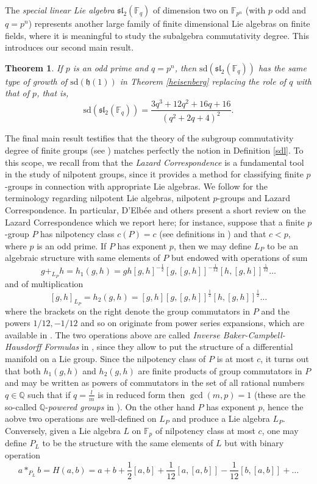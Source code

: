 \documentclass{amsart}
\newtheorem{theorem}{Theorem}[section]
\theoremstyle{definition}
\numberwithin{equation}{section}
\begin{document}
The \textit{special linear Lie algebra} $\mathfrak{sl}_2(\mathbb{F}_q)$ of dimension two on $\mathbb{F}_{p^n}$ (with $p$ odd and $q=p^n$) represents another large family of finite dimensional Lie algebras on finite fields, where it is meaningful to study the subalgebra commutativity degree. This introduces our second main result.

\begin{theorem} \label{sdforsl2}
 If $p$ is an odd prime and $q=p^n$, then $\mathrm{sd}(\mathfrak{sl}_2(\mathbb{F}_q))$ has the same type of growth of $\mathrm{sd}(\mathfrak{h}(1))$ in Theorem \ref{heisenberg} replacing the role of $q$ with that of $p$, that is,   $$\mathrm{sd}(\mathfrak{sl}_2(\mathbb{F}_q))=\frac{3q^3+12q^2+16q+16}{{(q^2+2q+4)^2}}.$$
\end{theorem}

The final main result testifies that the theory of the subgroup commutativity degree of finite groups (see \cite{sr1, sr2, or, mt}) matches perfectly the notion in Definition \ref{sdl}. To this scope, we recall from \cite{Khukhro1998} that the \textit{Lazard Correspondence} is a fundamental  tool in the study of nilpotent groups, since it provides a method  for classifying finite $p$-groups in connection with appropriate Lie algebras. We follow \cite{Khukhro1998} for the terminology regarding nilpotent Lie algebras, nilpotent $p$-groups and Lazard Correspondence. In particular,  D'Elb\'ee and others \cite[\S 2.3]{lazard} present a short review on the Lazard Correspondence which we report here; for instance,  suppose that a finite $p$-group $P$ has nilpotency class $c(P)=c$ (see definitions in \cite{Khukhro1998, rs} ) and that $c<p$, where $p$ is an odd prime. If $P$ has exponent $p$, then we may define $L_P$ to be an algebraic structure with same elements of $P$ but endowed with  operations of sum
\[g+_{L_P} h=h_1(g, h)=g h[g, h]^{-\frac{1}{2}}[g, [g, h]]^{-\frac{1}{12}}[h, [g, h]]^{\frac{1}{12}} \ldots  \] and of multiplication
\[
[g, h]_{L_P}=h_2(g, h)=[g, h][g, [g, h]]^{\frac{1}{2}}[h, [g, h]]^{\frac{1}{2}} \ldots \]
where the brackets on the right denote the group commutators in $P$ and the powers $1/12, -1/12$ and so on originate from  power series expansions, which are available in \cite[Chapters 9, 10]{Khukhro1998}.  The two operations above  are called \textit{Inverse Baker-Campbell-Hausdorff Formulas} in \cite[Lemma 10.7] {Khukhro1998}, since they allow to put the structure of a differential manifold on a Lie group.  Since the nilpotency class of $P$ is at most $c$, it turns out that both $h_1(g,h)$ and $h_2(g,h)$ are finite products of group commutators in $P$ and may be written as powers of commutators in the set of all  rational numbers $q \in \mathbb{Q}$ such that if $q=\frac{l}{m}$ is in reduced form then $\gcd(m, p)=1$ (these are the so-called $\mathbb{Q}$-\textit{powered groups} in \cite[Chapter 9]{Khukhro1998}). On the other hand  $P$ has  exponent $p$, hence the aobve two operations are well-defined on $L_P$ and produce a Lie algebra $L_P$.  Conversely, given a Lie algebra $L$ on $\mathbb{F}_p$ of nilpotency class at most $c$, one may define $P_L$ to be the structure with the same elements of $L$ but with  binary operation $$
a *_{P_L} b=H(a, b)=a+b+\frac{1}{2}[a, b]+\frac{1}{12}[a, [a, b]]-\frac{1}{12}[b, [a, b]]+\ldots
$$
\end{document}

